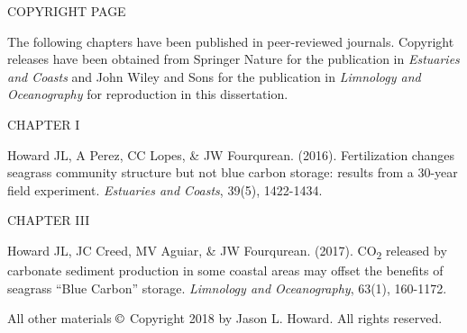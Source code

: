 
\maketitle


\begin{copyrightpage}
\noindent COPYRIGHT PAGE

\bigskip
The following chapters have been published in peer-reviewed journals. Copyright releases have been obtained from Springer Nature for the publication in \textit{Estuaries and Coasts} and John Wiley and Sons for the publication in \textit{Limnology and Oceanography} for reproduction in this dissertation.

\vspace{2em}
\noindent CHAPTER I

Howard JL, A Perez, CC Lopes, \& JW Fourqurean. (2016). Fertilization changes seagrass community structure but not blue carbon storage: results from a 30-year field experiment. \textit{Estuaries and Coasts}, 39(5), 1422-1434.


\bigskip

\noindent CHAPTER III

Howard JL, JC Creed, MV Aguiar, \& JW Fourqurean. (2017). CO\textsubscript{2} released by carbonate sediment production in some coastal areas may offset the benefits of seagrass “Blue Carbon” storage. \textit{Limnology and Oceanography}, 63(1), 160-1172.

\vspace{3em}

All other materials $\copyright$ Copyright 2018 by Jason L. Howard. All rights reserved.
\end{copyrightpage}



